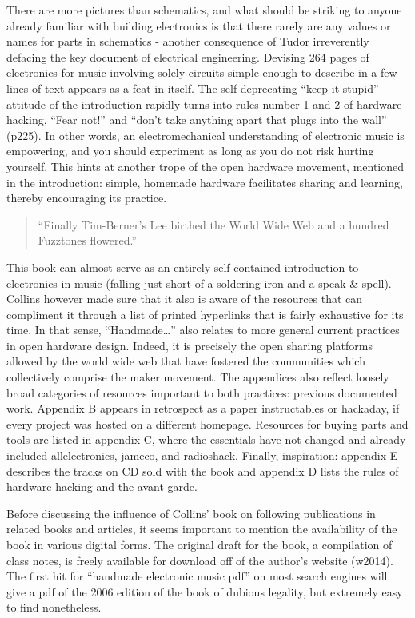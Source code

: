 There are more pictures than schematics, and what should be striking to anyone already familiar with building electronics is that there rarely are any values or names for parts in schematics - another consequence of Tudor irreverently defacing the key document of electrical engineering. Devising 264 pages of electronics for music involving solely circuits simple enough to describe in a few lines of text appears as a feat in itself. The self-deprecating “keep it stupid” attitude of the introduction rapidly turns into rules number 1 and 2 of hardware hacking, “Fear not!” and “don’t take anything apart that plugs into the wall” (p225). In other words, an electromechanical understanding of electronic music is empowering, and you should experiment as long as you do not risk hurting yourself. This hints at another trope of the open hardware movement, mentioned in the introduction: simple, homemade hardware facilitates sharing and learning, thereby encouraging its practice.

\begin{quote}

“Finally Tim-Berner’s Lee birthed the World Wide Web and a hundred Fuzztones flowered.” 
	
\cite[p211]{collins2006}

\end{quote}

This book can almost serve as an entirely self-contained introduction to electronics in music (falling just short of a soldering iron and a speak \& spell). Collins however made sure that it also is aware of the resources that can compliment it through a list of printed hyperlinks that is fairly exhaustive for its time. In that sense, “Handmade…” also relates to more general current practices in open hardware design. Indeed, it is precisely the open sharing platforms allowed by the world wide web that have fostered the communities which collectively comprise the maker movement. The appendices also reflect loosely broad categories of resources important to both practices: previous documented work. Appendix B appears in retrospect as a paper instructables or hackaday, if every project was hosted on a different homepage. Resources for buying parts and tools are listed in appendix C, where the essentials have not changed and already included allelectronics, jameco, and radioshack. Finally, inspiration: appendix E describes the tracks on CD sold with the book and appendix D lists the rules of hardware hacking and the avant-garde. 
	
	Before discussing the influence of Collins’ book on following publications in related books and articles, it seems important to mention the availability of the book in various digital forms. The original draft for the book, a compilation of class notes, is freely available for download off of the author’s website (w2014). The first hit for “handmade electronic music pdf” on most search engines will give a pdf of the 2006 edition of the book of dubious legality, but extremely easy to find nonetheless. 

